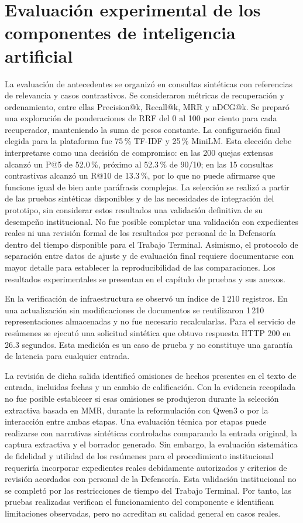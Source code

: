 \section{Evaluación experimental de los componentes de inteligencia artificial}
\label{sec:eval_ia}
La evaluación de antecedentes se organizó en consultas sintéticas con
referencias de relevancia y casos contrastivos. Se consideraron métricas de
recuperación y ordenamiento, entre ellas Precision@k, Recall@k, MRR y nDCG@k.
Se preparó una exploración de ponderaciones de RRF del 0 al 100 por ciento
para cada recuperador, manteniendo la suma de pesos constante. La configuración
final elegida para la plataforma fue 75\,\% TF-IDF y 25\,\% MiniLM.
Esta elección debe interpretarse como una decisión de compromiso: en las 200
quejas extensas alcanzó un P@5 de 52.0\,\%, próximo al 52.3\,\% de 90/10;
en las 15 consultas contrastivas alcanzó un R@10 de 13.3\,\%, por lo que
no puede afirmarse que funcione igual de bien ante paráfrasis complejas.
La selección se realizó a partir de las pruebas sintéticas disponibles y de las
necesidades de integración del prototipo, sin considerar estos resultados una
validación definitiva de su desempeño institucional. No fue posible completar
una validación con expedientes reales ni una revisión formal de los resultados
por personal de la Defensoría dentro del tiempo disponible para el Trabajo
Terminal. Asimismo, el protocolo de separación entre datos de ajuste y de
evaluación final requiere documentarse con mayor detalle para establecer
la reproducibilidad de las comparaciones. Los resultados experimentales se
presentan en el capítulo de pruebas y sus anexos.

En la verificación de infraestructura se observó un índice de 1\,210 registros.
En una actualización sin modificaciones de documentos se reutilizaron 1\,210
representaciones almacenadas y no fue necesario recalcularlas. Para el servicio
de resúmenes se ejecutó una solicitud sintética que obtuvo respuesta HTTP 200
en 26.3 segundos. Esta medición es un caso de prueba y no constituye una
garantía de latencia para cualquier entrada.

La revisión de dicha salida identificó omisiones de hechos presentes en el
texto de entrada, incluidas fechas y un cambio de calificación. Con la evidencia
recopilada no fue posible establecer si esas omisiones se produjeron durante la
selección extractiva basada en MMR, durante la reformulación con Qwen3 o por la
interacción entre ambas etapas. Una evaluación técnica por etapas puede realizarse
con narrativas sintéticas controladas comparando la entrada original, la captura
extractiva y el borrador generado. Sin embargo, la evaluación sistemática de
fidelidad y utilidad de los resúmenes para el procedimiento institucional
requeriría incorporar expedientes reales debidamente autorizados y criterios de
revisión acordados con personal de la Defensoría. Esta validación institucional no
se completó por las restricciones de tiempo del Trabajo Terminal. Por tanto,
las pruebas realizadas verifican el funcionamiento del componente e identifican
limitaciones observadas, pero no acreditan su calidad general en casos reales.

